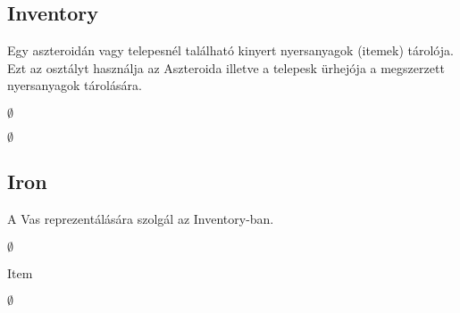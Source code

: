 \subsection{Inventory}
\begin{class-template-responsibility}
Egy aszteroidán vagy telepesnél található kinyert nyersanyagok (itemek) tárolója.
Ezt az osztályt használja az Aszteroida illetve a telepesk ürhejója a megszerzett nyersanyagok tárolására.
\end{class-template-responsibility}
\begin{class-template-interface}
$\emptyset$
\end{class-template-interface}
\begin{class-template-baseclass}
$\emptyset$
\end{class-template-baseclass}
\begin{class-template-attribute}
\end{class-template-attribute}
\begin{class-template-method}
\end{class-template-method}


\subsection{Iron}
\begin{class-template-responsibility}
 A Vas reprezentálására szolgál az Inventory-ban.
\end{class-template-responsibility}
\begin{class-template-interface}
$\emptyset$
\end{class-template-interface}
\begin{class-template-baseclass}
Item
\end{class-template-baseclass}
\begin{class-template-attribute}
\item[] $\emptyset$
\end{class-template-attribute}
\begin{class-template-method}
\end{class-template-method}


